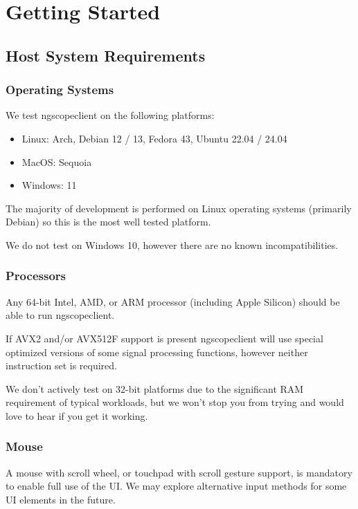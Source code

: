 \chapter{Getting Started}

\section{Host System Requirements}

\subsection{Operating Systems}

We test ngscopeclient on the following platforms:

\begin{itemize}
\item Linux: Arch, Debian 12 / 13, Fedora 43, Ubuntu 22.04 / 24.04
\item MacOS: Sequoia
\item Windows: 11
\end{itemize}

The majority of development is performed on Linux operating systems (primarily Debian) so this is the most well
tested platform.

We do not test on Windows 10, however there are no known incompatibilities.

\subsection{Processors}

Any 64-bit Intel, AMD, or ARM processor (including Apple Silicon) should be able to run ngscopeclient.

If AVX2 and/or AVX512F support is present ngscopeclient will use special optimized versions of some signal processing
functions, however neither instruction set is required.

We don't actively test on 32-bit platforms due to the significant RAM requirement of typical workloads, but we won't stop you from trying and would love to hear if you get it working.

\subsection{Mouse}

A mouse with scroll wheel, or touchpad with scroll gesture support, is mandatory to enable full use of the UI. We may
explore alternative input methods for some UI elements in the future.

